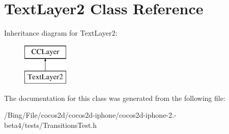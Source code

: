 \hypertarget{interface_text_layer2}{\section{Text\-Layer2 Class Reference}
\label{interface_text_layer2}
}
Inheritance diagram for Text\-Layer2\-:\begin{figure}[H]
\begin{center}
\leavevmode
\includegraphics[height=2.000000cm]{interface_text_layer2}
\end{center}
\end{figure}


The documentation for this class was generated from the following file\-:\begin{DoxyCompactItemize}
\item 
/\-Bing/\-File/cocos2d/cocos2d-\/iphone/cocos2d-\/iphone-\/2.-\/beta4/tests/Transitions\-Test.\-h\end{DoxyCompactItemize}
